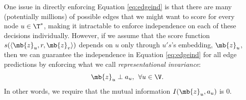 One issue in directly enforcing Equation \eqref{eq:edgeind} is that there are many (potentially millions) of possible edges that we might want to score for every node $u \in \T^*$, making it intractable to enforce independence on each of these decisions individually.
However, if we assume that the score function $s(\langle \mb{z}_u, r, \mb{z}_v \rangle)$ depends on $u$ only through $u's$'s embedding, $\mb{z}_u$, then we can guarantee the independence in Equation \eqref{eq:edgeind} for all edge predictions by enforcing what we call {\em representational invariance}:
\begin{equation}\label{eq:repinvar}
    \mb{z}_u \perp a_u, \:\: \forall u \in \V.
\end{equation}
In other words, we require that the mutual information $I(\mb{z}_u, a_u)$ is $0$.

